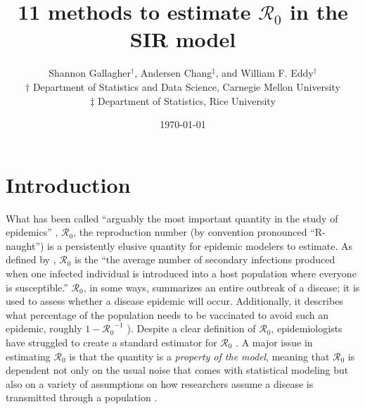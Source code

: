 \message{ !name(draft_v13.tex)}\documentclass[12pt]{article}
\newcommand{\Wxxsir}{11 }
\newcommand{\rr}{\ensuremath{\mathcal{R}_0}}
\begin{document}






\title{\Wxxsir methods to estimate $\rr$ in the SIR model}
\author{ Shannon Gallagher$^{\dag}$, Andersen Chang$^{\ddag}$, and William F. Eddy$^{\dag}$ \\$\dag$ Department of Statistics and Data Science, Carnegie Mellon University\\ $\ddag$ Department of Statistics, Rice University}
\date{\today}
\maketitle



\section{Introduction}\label{sec:intro}
What has been called ``arguably the most important quantity in the study of epidemics'' \citep{Heesterbeek2002},  $\mathcal{R}_0$, the reproduction number (by convention pronounced ``R-naught'') is a persistently elusive quantity for epidemic modelers to estimate.  As defined by \citet{anderson1992}, $\rr$ is the ``the average number of secondary infections produced when one infected individual is introduced into a host population where everyone is susceptible.''  $\rr$, in some ways, summarizes an entire outbreak of a disease; it  is used to assess whether a disease epidemic will occur.  Additionally, it describes what percentage of the population needs to be vaccinated to avoid such an epidemic, roughly $1-\rr^{-1}$ \citep{anderson1992}).  Despite a clear definition of $\rr$, epidemiologists have struggled to create a standard  estimator for $\rr$  \citep{hethcote2000}.  A major issue in estimating $\rr$ is that the quantity is a \textit{property of the model}, meaning that $\rr$ is dependent not only on the usual noise that comes with statistical modeling but also on a variety of assumptions on how researchers assume a disease is transmitted through a population \citep{diekmann2009}.
\end{document}
